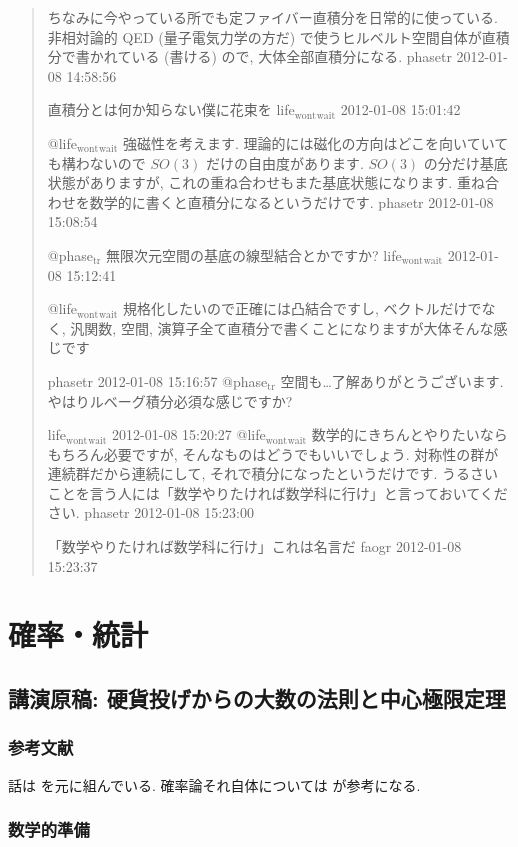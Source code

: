 \documentclass[openany, a4paper, oneside]{book}
\theoremstyle{break}
\theoremstyle{breakdefn}
\begin{document}
\begin{quote}
ちなみに今やっている所でも定ファイバー直積分を日常的に使っている.
非相対論的 QED (量子電気力学の方だ) で使うヒルベルト空間自体が直積分で書かれている (書ける) ので, 大体全部直積分になる.
phasetr 2012-01-08 14:58:56

直積分とは何か知らない僕に花束を
life$_{\mathrm{wont}}$$_{\mathrm{wait}}$ 2012-01-08 15:01:42

@life$_{\mathrm{wont}}$$_{\mathrm{wait}}$ 強磁性を考えます.
理論的には磁化の方向はどこを向いていても構わないので $SO (3)$ だけの自由度があります.
$SO (3)$ の分だけ基底状態がありますが, これの重ね合わせもまた基底状態になります.
重ね合わせを数学的に書くと直積分になるというだけです.
phasetr 2012-01-08 15:08:54

@phase$_{\mathrm{tr}}$ 無限次元空間の基底の線型結合とかですか?
life$_{\mathrm{wont}}$$_{\mathrm{wait}}$ 2012-01-08 15:12:41

@life$_{\mathrm{wont}}$$_{\mathrm{wait}}$ 規格化したいので正確には凸結合ですし,
ベクトルだけでなく, 汎関数, 空間, 演算子全て直積分で書くことになりますが大体そんな感じです

phasetr 2012-01-08 15:16:57
@phase$_{\mathrm{tr}}$ 空間も…了解ありがとうございます. やはりルベーグ積分必須な感じですか?

life$_{\mathrm{wont}}$$_{\mathrm{wait}}$ 2012-01-08 15:20:27
@life$_{\mathrm{wont}}$$_{\mathrm{wait}}$ 数学的にきちんとやりたいならもちろん必要ですが, そんなものはどうでもいいでしょう.
対称性の群が連続群だから連続にして, それで積分になったというだけです.
うるさいことを言う人には「数学やりたければ数学科に行け」と言っておいてください.
phasetr 2012-01-08 15:23:00

「数学やりたければ数学科に行け」これは名言だ
faogr 2012-01-08 15:23:37
\end{quote}
\part{確率・統計}
\label{sec-8}
\chapter{講演原稿: 硬貨投げからの大数の法則と中心極限定理}
\label{sec-8-1}
\section{参考文献}
\label{sec-8-1-1}

話は \cite{MarkKac1} を元に組んでいる.
確率論それ自体については \cite{TadahisaFunaki1} が参考になる.
\section{数学的準備}
\label{sec-8-1-2}
\end{document}
